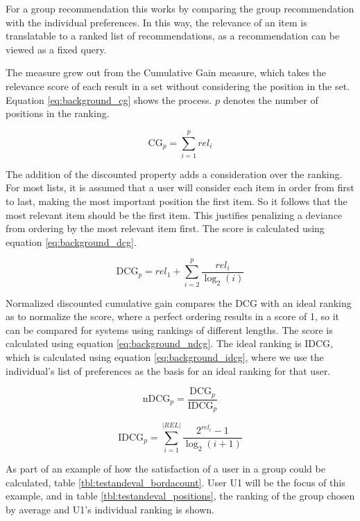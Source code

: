 For a group recommendation this works by comparing the group recommendation with the individual preferences. In this way, the relevance of an item is translatable to a ranked list of recommendations, as a recommendation can be viewed as a fixed query.

The measure grew out from the Cumulative Gain measure, which takes the relevance score of each result in a set without considering the position in the set. Equation \ref{eq:background_cg} shows the process. $p$ denotes the number of positions in the ranking.

\begin{equation}\label{eq:background_cg}
	\text{CG}_p = \sum_{i=1}^{p}\textit{rel}_i
\end{equation}

The addition of the discounted property adds a consideration over the ranking. For most lists, it is assumed that a user will consider each item in order from first to last, making the most important position the first item. So it follows that the most relevant item should be the first item. This justifies penalizing a deviance from ordering by the most relevant item first. The score is calculated using equation \ref{eq:background_dcg}.

\begin{equation}\label{eq:background_dcg}
	\text{DCG}_p = \textit{rel}_1 + \sum_{i=2}^{p}\frac{\textit{rel}_i}{\log_2(i)}
\end{equation}

Normalized discounted cumulative gain compares the DCG with an ideal ranking as to normalize the score, where a perfect ordering results in a score of 1, so it can be compared for systems using rankings of different lengths. The score is calculated using equation \ref{eq:background_ndcg}. The ideal ranking is IDCG, which is calculated using equation \ref{eq:background_idcg}, where we use the individual's list of preferences as the basis for an ideal ranking for that user.

\begin{equation}\label{eq:background_ndcg}
	\text{nDCG}_p = \frac{\text{DCG}_p}{\text{IDCG}_p}
\end{equation}

\begin{equation}\label{eq:background_idcg}
	\text{IDCG}_p = \sum_{i=1}^{|REL|} \frac{2^{\textit{rel}_i}-1}{\log_2(i+1)}
\end{equation}

As part of an example of how the satisfaction of a user in a group could be calculated, table \ref{tbl:testandeval_bordacount}. User U1 will be the focus of this example, and in table \ref{tbl:testandeval_positions}, the ranking of the group chosen by average and U1's individual ranking is shown.

